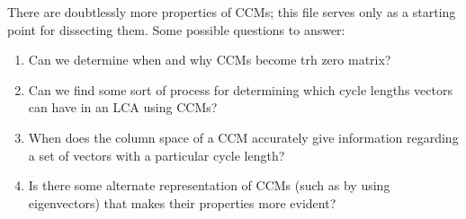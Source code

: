 \documentclass[a4paper, 12pt, reqno]{amsart}
\begin{document}
	There are doubtlessly more properties of CCMs; this file serves only as a starting point for dissecting them. Some possible questions to answer:
	\begin{enumerate}
		\item{Can we determine when and why CCMs become trh zero matrix?}
		\item{Can we find some sort of process for determining which cycle lengths vectors can have in an LCA using CCMs?}
		\item{When does the column space of a CCM accurately give information regarding a set of vectors with a particular cycle length?}
		\item{Is there some alternate representation of CCMs (such as by using eigenvectors) that makes their properties more evident?}
	\end{enumerate}
	
	
	
	
\end{document}
